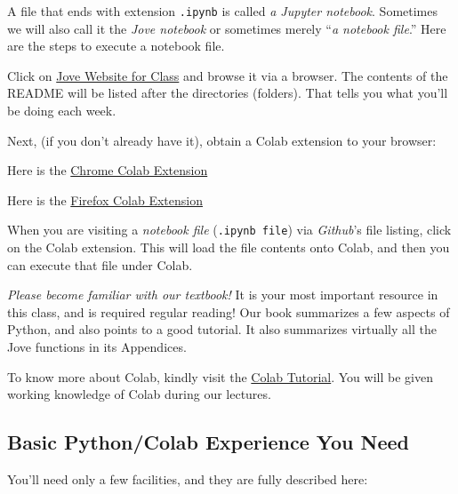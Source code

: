 \documentclass[12pt]{article}
\begin{document}
A file that ends with extension {\tt .ipynb} is called {\em a Jupyter notebook}.
Sometimes we will also call it the {\em Jove notebook} or
sometimes merely ``{\em a notebook file}.''
Here are the steps to execute a  notebook file.
\begin{compactitem}
  
\item Click on 
\href{https://github.com/ganeshutah/Jove/tree/master/For_CS3100_Fall2020}{Jove Website for Class}
  and browse it via a browser. The contents of the README will be
  listed after the directories (folders). That tells you what you'll be doing each week.

\item Next, (if you don't already have it), obtain a Colab extension to your browser:
  \begin{compactitem}
  \item Here is the \href{https://chrome.google.com/webstore/detail/open-in-colab/iogfkhleblhcpcekbiedikdehleodpjo?hl=en}{Chrome Colab Extension}
  \item Here is the \href{https://addons.mozilla.org/en-US/firefox/addon/open-in-colab/}{Firefox Colab Extension}
  \end{compactitem}

\item When you are visiting a {\em notebook file} ({\tt .ipynb file})
  via {\em Github}'s file listing, click on the Colab extension. This
  will load the file contents onto Colab, and then you can execute that
  file under Colab.
  
\item {\em Please become familiar with our textbook!} It is your most important resource
  in this class, and is required regular reading!
  Our book summarizes a few aspects of Python, and also points to a good tutorial.
  It also summarizes virtually all the Jove functions in its Appendices.

  
\item  To know more about Colab, kindly visit the
  \href{https://colab.research.google.com/notebooks/intro.ipynb#}{Colab Tutorial}.
  You will be given working knowledge of Colab during our lectures.

\end{compactitem}


\subsection{Basic Python/Colab Experience You Need}
You'll need only a few facilities, and they are fully described here:
\end{document}
